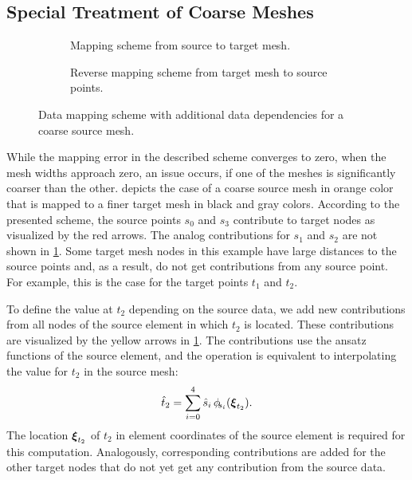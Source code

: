 \subsection{Special Treatment of Coarse Meshes}

\begin{figure}%
  \centering%
  \begin{subfigure}{0.4\textwidth}
    \centering
    \def\svgwidth{\textwidth}
    \caption{Mapping scheme from source to target mesh.}%
    \label{fig:mapping_between_meshes_5}%
  \end{subfigure}
  \quad
  \begin{subfigure}{0.4\textwidth}
    \centering
    \def\svgwidth{\textwidth}
    \caption{Reverse mapping scheme from target mesh to source points.}%
    \label{fig:mapping_between_meshes_6}%
  \end{subfigure}
  \caption{Data mapping scheme with additional data dependencies for a coarse source mesh.}%
  \label{fig:mapping_between_meshes_56}%
\end{figure}%

While the mapping error in the described scheme converges to zero, when the mesh widths approach zero, an issue occurs, if one of the meshes is significantly coarser than the other.  depicts the case of a coarse source mesh in orange color that is mapped to a finer target mesh in black and gray colors. According to the presented scheme, the source points $s_0$ and $s_3$ contribute to target nodes as visualized by the red arrows. The analog contributions for $s_1$ and $s_2$ are not shown in \cref{fig:mapping_between_meshes_5}. Some target mesh nodes in this example have large distances to the source points and, as a result, do not get contributions from any source point. For example, this is the case for the target points $t_1$ and $t_2$.

To define the value at $t_2$ depending on the source data, we add new contributions from all nodes of the source element in which $t_2$ is located. These contributions are visualized by the yellow arrows in \cref{fig:mapping_between_meshes_5}.
The contributions use the ansatz functions of the source element, and the operation is equivalent to interpolating the value for $t_2$ in the source mesh:
\begin{align*}
  \hat{t}_2 = \s{i=0}{4}\hat{s}_i\,\phi_{\noexpand\mkern-4mu s_i}(\bfxi_{t_2}).
\end{align*}
The location $\boldsymbol{\xi}_{t_2}$ of $t_2$ in element coordinates of the source element is required for this computation. Analogously, corresponding contributions are added for the other target nodes that do not yet get any contribution from the source data.

